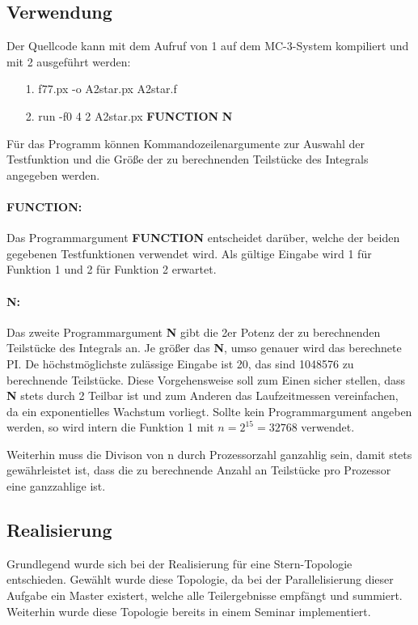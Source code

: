 \subsection{Verwendung}
\label{ref:verwendung}
Der Quellcode kann mit dem Aufruf von 1 auf dem MC-3-System kompiliert und mit 2 ausgeführt werden:
\begin{itemize}
	\item[1.] f77.px -o A2star.px A2star.f
	\item[2.] run -f0 4 2 A2star.px \textbf{FUNCTION} \textbf{N}
\end{itemize}
Für das Programm können Kommandozeilenargumente zur Auswahl der Testfunktion und die Größe der zu berechnenden Teilstücke des Integrals angegeben werden.
\paragraph{FUNCTION:}
Das Programmargument \textbf{FUNCTION} entscheidet darüber, welche der beiden gegebenen Testfunktionen verwendet wird.
Als gültige Eingabe wird 1 für Funktion 1 und 2 für Funktion 2 erwartet.
\paragraph{N:}
Das zweite Programmargument \textbf{N} gibt die 2er Potenz der zu berechnenden Teilstücke des Integrals an.
Je größer das \textbf{N}, umso genauer wird das berechnete PI.
De höchstmöglichste zulässige Eingabe ist 20, das sind 1048576 zu berechnende Teilstücke.
Diese Vorgehensweise soll zum Einen sicher stellen, dass \textbf{N} stets durch 2 Teilbar ist und zum Anderen das Laufzeitmessen vereinfachen, da ein exponentielles Wachstum vorliegt.
Sollte kein Programmargument angeben werden, so wird intern die Funktion 1 mit $n = 2^{15} = 32768$ verwendet.

Weiterhin muss die Divison von n durch Prozessorzahl ganzahlig sein, damit stets gewährleistet ist, dass die zu berechnende Anzahl an Teilstücke pro Prozessor eine ganzzahlige ist.

\subsection{Realisierung}
\label{ref:realisierung}
Grundlegend wurde sich bei der Realisierung für eine Stern-Topologie entschieden.
Gewählt wurde diese Topologie, da bei der Parallelisierung dieser Aufgabe ein Master existert, welche alle Teilergebnisse empfängt und summiert.
Weiterhin wurde diese Topologie bereits in einem Seminar implementiert.

